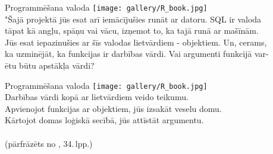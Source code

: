 \documentclass{beamer}
\begin{document}
    \begin{frame}{Programmēšana valoda}
    \vspace{-2.5cm}
    \hspace{11.5cm}
    \texttt{[image: gallery/R\_book.jpg]}\\
\vspace{0.5cm}
\hspace{1cm}
    "Šajā projektā jūs esat arī iemācījušies runāt ar datoru. \pause 
    SQL ir valoda \\ \vspace{0.1cm} \hspace{1cm} tāpat kā angļu, spāņu vai vācu, izņemot to, ka tajā runā ar mašīnām.\\ \pause \vspace{0.1cm}
    \hspace{1cm} Jūs esat iepazinušies ar šīs valodas lietvārdiem - objektiem. \pause Un, cerams, \\ \vspace{0.1cm} \hspace{1cm} ka uzminējāt, ka funkcijas ir darbības vārdi. \pause Vai argumenti funkcijā var- \\ \vspace{0.1cm} \hspace{1cm} ētu būtu apstākļa vārdi? 
    \end{frame}

    \begin{frame}{Programmēšana valoda}
    \vspace{-1.5cm}
    \hspace{11.5cm}
    \texttt{[image: gallery/R\_book.jpg]}\\
\vspace{-0.5cm}
\hspace{1cm}
    Darbības vārdi kopā ar lietvārdiem veido teikumu. \\ \pause 
    \vspace{0.4cm}
    \hspace{1cm} 
    Apvienojot funkcijas ar objektiem, jūs izsakāt veselu domu. \\ \pause 
    \vspace{0.4cm}
    \hspace{1cm} 
    Kārtojot domas loģiskā secībā, jūs attīstāt argumentu. \\ \pause
    \vspace{0.4cm}
    \hspace{1cm}
      \\ 
    \vspace{0.4cm}
    \hspace{6cm} (pārfrāzēts no , 34.\,lpp.) \\
    \end{frame}
\end{document}
